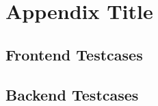 \chapter{Appendix Title}



\section{Frontend Testcases} \label{sec:frontend_testcases}

\section{Backend Testcases} \label{sec:backend_testcases}
